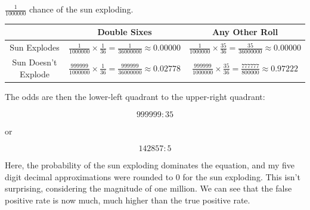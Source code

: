 \documentclass{article}
\begin{document}
$\frac{1}{1000000}$ chance of the sun exploding.

\begin{tabular}{c | c c}
	  & Double Sixes & Any Other Roll \\
	\hline
	Sun Explodes & $\frac{1}{1000000} \times \frac{1}{36} = \frac{1}{36000000} \approx 0.00000 $ & $\frac{1}{1000000} \times \frac{35}{36} = \frac{35}{36000000} \approx 0.00000 $ \\
	Sun Doesn't Explode & $\frac{999999}{1000000} \times \frac{1}{36} = \frac{999999}{36000000} \approx 0.02778 $ & $\frac{999999}{1000000} \times \frac{35}{36} = \frac{777777}{800000} \approx 0.97222 $ \\
\end{tabular}

The odds are then the lower-left quadrant to the upper-right quadrant:

$$
999999:35
$$

or

$$
142857:5
$$

Here, the probability of the sun exploding dominates the equation, and my five 
digit decimal approximations were rounded to 0 for the sun exploding. This 
isn't surprising, considering the magnitude of one million. We can see that the 
false positive rate is now much, much higher than the true positive rate.
\end{document}
